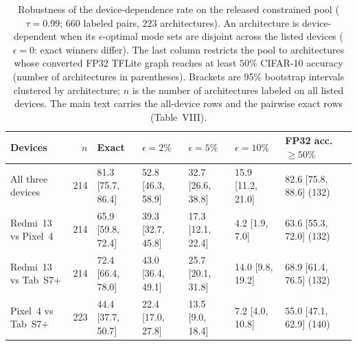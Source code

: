 
\begin{table}[!htbp]
\centering
\caption{Robustness of the device-dependence rate on the released constrained
pool ($\tau=0.99$; $660$ labeled pairs, $223$ architectures). An architecture
is device-dependent when its $\epsilon$-optimal mode sets are disjoint across
the listed devices ($\epsilon=0$: exact winners differ). The last column
restricts the pool to architectures whose converted FP32 TFLite graph reaches
at least $50\%$ CIFAR-10 accuracy (number of architectures in parentheses).
Brackets are 95\% bootstrap intervals clustered by architecture; $n$ is the
number of architectures labeled on all listed devices. The main text carries
the all-device rows and the pairwise exact rows (Table~VIII).}
\label{tab:robust_extra}
\footnotesize
\setlength{\tabcolsep}{4pt}
\begin{tabular}{@{}lrlllll@{}}
\toprule
\textbf{Devices} & $n$ & \textbf{Exact} & $\epsilon=2\%$ & $\epsilon=5\%$ & $\epsilon=10\%$ & \textbf{FP32 acc.\ $\geq50\%$} \\
\midrule
All three devices & 214 & 81.3 [75.7,\,86.4] & 52.8 [46.3,\,58.9] & 32.7 [26.6,\,38.8] & 15.9 [11.2,\,21.0] & 82.6 [75.8,\,88.6] (132) \\
Redmi~13 vs Pixel~4 & 214 & 65.9 [59.8,\,72.4] & 39.3 [32.7,\,45.8] & 17.3 [12.1,\,22.4] & 4.2 [1.9,\,7.0] & 63.6 [55.3,\,72.0] (132) \\
Redmi~13 vs Tab~S7+ & 214 & 72.4 [66.4,\,78.0] & 43.0 [36.4,\,49.1] & 25.7 [20.1,\,31.8] & 14.0 [9.8,\,19.2] & 68.9 [61.4,\,76.5] (132) \\
Pixel~4 vs Tab~S7+ & 223 & 44.4 [37.7,\,50.7] & 22.4 [17.0,\,27.8] & 13.5 [9.0,\,18.4] & 7.2 [4.0,\,10.8] & 55.0 [47.1,\,62.9] (140) \\
\bottomrule
\end{tabular}
\end{table}
